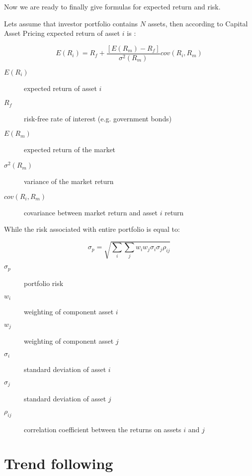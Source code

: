 Now we are ready to finally give formulas for expected return and risk.

Lets assume that investor portfolio contains $N$ assets, then according to Capital Asset Pricing expected return of asset $i$ is \cite{CAPM}: 

\begin{equation}
\label{first_eq}
 E(R_{i})  = R_{f} + \frac{ [E(R_{m}) - R_{f}]} {\sigma^2(R_{m})} cov(R_{i}, R_{m})
\end{equation} 

\begin{description}
  \item [$E(R_{i})$]
    expected return of asset $i$
  \item [$R_{f}$]
    risk-free rate of interest (e.g. government bonds)
  \item [$E(R_{m})$]
    expected return of the market
  \item [$\sigma^2(R_{m})$]
    variance of the market return
  \item [$cov(R_{i}, R_{m})$]
    covariance between market return and asset $i$ return
\end{description}

While the risk associated with entire portfolio is equal to:

\begin{equation}
\label{sec_eq}
 \sigma_{p}  = \sqrt{\sum_{i} \sum_{j} w_{i}w_{j} \sigma_{i} \sigma_{j} \rho_{ij}}
\end{equation} 

\begin{description}
  \item [$\sigma_{p}$]
    portfolio risk
  \item [$w_{i}$]
    weighting of component asset $i$
  \item [$w_{j}$]
    weighting of component asset $j$
  \item [$\sigma_{i}$]
    standard deviation of asset $i$
  \item [$\sigma_{j}$]
    standard deviation of asset $j$
  \item [$\rho_{ij}$]
    correlation coefficient between the returns on assets $i$ and $j$
\end{description}
 

\section{Trend following}
\label{sec:trendFollowing}

